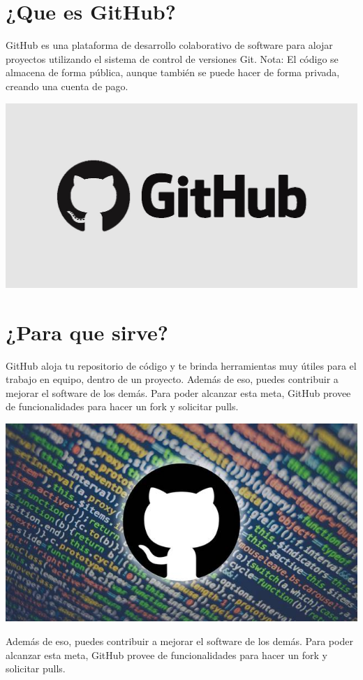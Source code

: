 \section{¿Que es GitHub?} 
GitHub es una plataforma de desarrollo colaborativo de software para alojar proyectos utilizando el sistema de control de versiones Git.
Nota:
El código se almacena de forma pública, aunque también se puede hacer de forma privada, creando una cuenta de pago.

\begin{center}
\includegraphics[width=14cm]{./Imagenes/imagen1} 
\end{center}

\section{¿Para que sirve?} 
GitHub aloja tu repositorio de código y te brinda herramientas muy útiles para el trabajo en equipo, dentro de un proyecto.
Además de eso, puedes contribuir a mejorar el software de los demás. Para poder alcanzar esta meta, GitHub provee de funcionalidades para hacer un fork y solicitar pulls.

\begin{center}
\includegraphics[width=14cm]{./Imagenes/imagen2} 
\end{center}
Además de eso, puedes contribuir a mejorar el software de los demás. Para poder alcanzar esta meta, GitHub provee de funcionalidades para hacer un fork y solicitar pulls.

